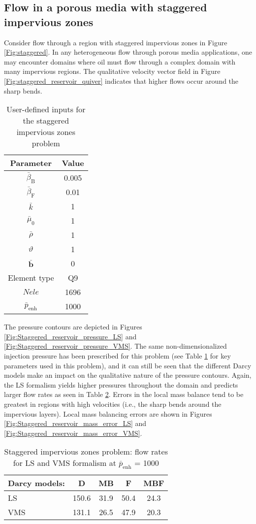 \documentclass[11pt,reqno]{amsart}
\begin{document}
\subsection{Flow in a porous media with staggered impervious zones}
Consider flow through a region with staggered impervious zones in Figure 
\ref{Fig:staggered}. In any heterogeneous 
flow through porous media applications, one may encounter domains where oil must flow 
through a complex domain with many impervious regions. The qualitative velocity vector field in Figure 
\ref{Fig:staggered_reservoir_quiver} indicates that higher flows occur around the sharp 
bends.
\begin{table}[b!]
  \centering
  \caption{User-defined inputs for the staggered impervious zones problem}
  \begin{tabular}{cc}
    \hline
    Parameter & Value \\ \hline
    $\bar{\beta}_{\mathrm{B}}$ & 0.005\\
    $\bar{\beta}_{\mathrm{F}}$ & 0.01\\	
    $\bar{k}$ & 1\\
    $\bar{\mu}_0$ & 1\\
    $\bar{\rho}$ & 1 \\
    $\vartheta$ & 1 \\
    $\bar{\mathbf{b}}$ & 0 \\
    Element type & Q9\\
    $Nele$ & 1696\\
    $\bar{p}_{\mathrm{enh}}$ & 1000\\
    \hline
  \end{tabular}
  \label{Tab:staggered_zones}
\end{table}
The pressure contours are depicted in Figures \ref{Fig:Staggered_reservoir_pressure_LS} and
\ref{Fig:Staggered_reservoir_pressure_VMS}. The same non-dimensionalized injection pressure has been prescribed for 
this problem (see Table \ref{Tab:staggered_zones} for key parameters used in this 
problem), and it can still be seen that the different Darcy models make an impact on the 
qualitative nature of the pressure contours. Again, the LS formalism yields higher pressures throughout the domain 
and predicts larger flow rates as seen in Table \ref{Tab:staggered_reservoir_flowrates}. Errors in the local 
mass balance tend to be greatest in regions with high velocities (i.e., the sharp bends around the impervious layers). 
Local mass balancing errors are shown in Figures \ref{Fig:Staggered_reservoir_mass_error_LS} and 
\ref{Fig:Staggered_reservoir_mass_error_VMS}.
\begin{table}[t!]
  \centering
  \caption{Staggered impervious zones problem: flow rates for LS and VMS formalism at $\bar{p}_{\mathrm{enh}}$ = 1000}
  \begin{tabular}{l|cccc}
    \hline
    Darcy models: & D & MB & F & MBF \\ \hline
    LS & 150.6 & 31.9 & 50.4 & 24.3 \\
    VMS & 131.1 & 26.5 & 47.9 & 20.3 \\
    \hline
  \end{tabular}
  \label{Tab:staggered_reservoir_flowrates}
\end{table}  
\end{document}
